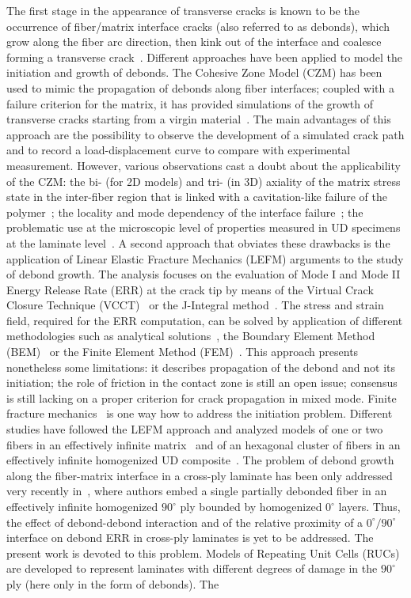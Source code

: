 \documentclass[review]{elsarticle}
\begin{document}
The first stage in the appearance of transverse cracks is known to be the occurrence of fiber/matrix interface cracks (also referred to as debonds), which grow along the fiber arc direction, then kink out of the interface and coalesce forming a transverse crack~\cite{Bailey1981}. Different approaches have been applied to model the initiation and growth of debonds. The Cohesive Zone Model (CZM) has been used to mimic the propagation of debonds along fiber interfaces; coupled with a failure criterion for the matrix, it has provided simulations of the growth of transverse cracks starting from a virgin material~\cite{Kushch2011,Canal2012,Bouhala2013,Herraez2015}. The main advantages of this approach are the possibility to observe the development of a simulated crack path and to record a load-displacement curve to compare with experimental measurement. However, various observations cast a doubt about the applicability of the CZM: the bi- (for 2D models) and tri- (in 3D) axiality of the matrix stress state in the inter-fiber region that is linked with a cavitation-like failure of the polymer~\cite{Asp1995}; the locality and mode dependency of the interface failure~\cite{Mantic2009}; the problematic use at the microscopic level of properties measured in UD specimens at the laminate level~\cite{Canal2012}. A second approach that obviates these drawbacks is the application of Linear Elastic Fracture Mechanics (LEFM) arguments to the study of debond growth. The analysis focuses on the evaluation of Mode I and Mode II Energy Release Rate (ERR) at the crack tip by means of the Virtual Crack Closure Technique (VCCT)~\cite{Krueger2004} or the J-Integral method~\cite{Rice1968}. The stress and strain field, required for the ERR computation, can be solved by application of different methodologies such as analytical solutions~\cite{Toya1974}, the Boundary Element Method (BEM)~\cite{Paris1996} or the Finite Element Method (FEM)~\cite{Zhuang2018}. This approach presents nonetheless some limitations: it describes propagation of the debond and not its initiation; the role of friction in the contact zone is still an open issue; consensus is still lacking on a proper criterion for crack propagation in mixed mode. Finite fracture mechanics~\cite{MunozReja2016} is one way how to address the initiation problem. Different studies have followed the LEFM approach and analyzed models of one or two fibers in an effectively infinite matrix~\cite{Correa2011,Correa2013,Correa2014,Sandino2016,Sandino2018} and of an hexagonal cluster of fibers in an effectively infinite homogenized UD composite~\cite{Varna2017,Zhuang2018}. The problem of debond growth along the fiber-matrix interface in a cross-ply laminate has been only addressed very recently in~\cite{Velasco2018,Paris2018}, where authors embed a single partially debonded fiber in an effectively infinite homogenized $90^{\circ}$ ply bounded by homogenized $0^{\circ}$ layers. Thus, the effect of debond-debond interaction and of the relative proximity of a $0^{\circ}/90^{\circ}$ interface on debond ERR in cross-ply laminates is yet to be addressed. The present work is devoted to this problem. Models of Repeating Unit Cells (RUCs) are developed to represent laminates with different degrees of damage in the $90^{\circ}$ ply (here only in the form of debonds). The 
\end{document}
